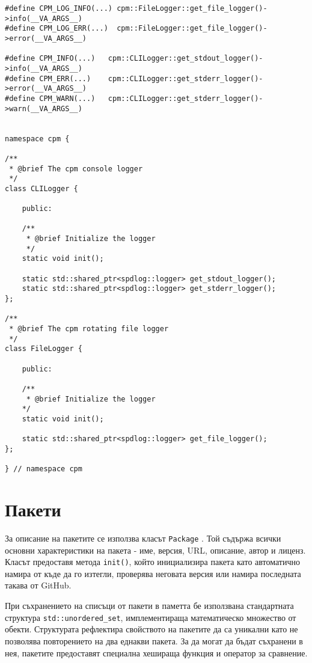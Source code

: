 \begin{lstlisting}[style=cpp,
				   caption=Класове и директиви за диагностика и обратна връзка,
				   label={lst:logger}]
#define CPM_LOG_INFO(...) cpm::FileLogger::get_file_logger()->info(__VA_ARGS__)
#define CPM_LOG_ERR(...)  cpm::FileLogger::get_file_logger()->error(__VA_ARGS__)

#define CPM_INFO(...)	cpm::CLILogger::get_stdout_logger()->info(__VA_ARGS__)
#define CPM_ERR(...)	cpm::CLILogger::get_stderr_logger()->error(__VA_ARGS__)
#define CPM_WARN(...)	cpm::CLILogger::get_stderr_logger()->warn(__VA_ARGS__)


namespace cpm {

/**
 * @brief The cpm console logger
 */
class CLILogger {

	public:

	/**
	 * @brief Initialize the logger
	 */
	static void init();

	static std::shared_ptr<spdlog::logger> get_stdout_logger();
	static std::shared_ptr<spdlog::logger> get_stderr_logger();
};

/**
 * @brief The cpm rotating file logger
 */
class FileLogger {

	public:

	/**
	 * @brief Initialize the logger
	*/
	static void init();

	static std::shared_ptr<spdlog::logger> get_file_logger();
};

} // namespace cpm
\end{lstlisting}




\section{Пакети}

За описание на пакетите се използва класът \texttt{Package}
. Той съдържа всички основни характеристики на пакета - име,
версия, URL, описание, автор и лиценз. Класът предоставя метода \texttt{init()},
който инициализира пакета като автоматично намира от къде да го изтегли,
проверява неговата версия или намира последната такава от GitHub.

При съхранението на списъци от пакети в паметта бе използвана стандартната
структура \texttt{std::unordered\_set}, имплементираща математическо множество
от обекти. Структурата рефлектира свойството на пакетите да са уникални като не
позволява повторението на два еднакви пакета. За да могат да бъдат съхранени в
нея, пакетите предоставят специална хешираща функция и оператор за сравнение.
\\ \\ \\

